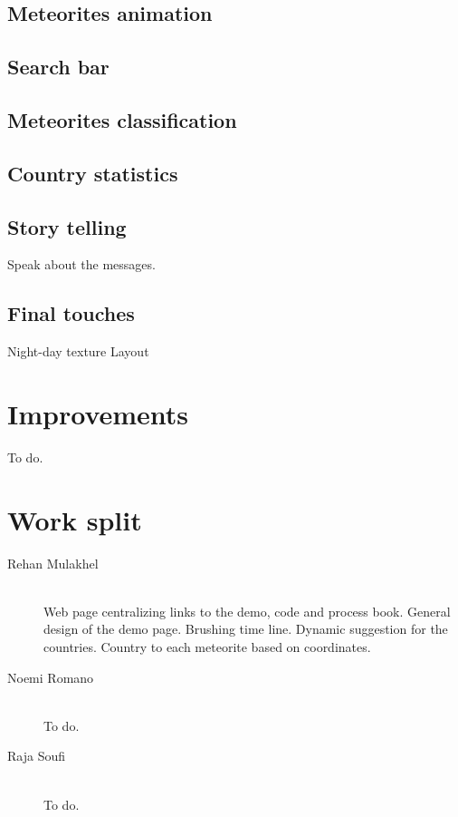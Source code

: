 \documentclass[10pt,conference,compsocconf]{IEEEtran}
\begin{document}
\subsection{Meteorites animation}







\subsection{Search bar}


\subsection{Meteorites classification}


\subsection{Country statistics}


\subsection{Story telling}
Speak about the messages. 

\subsection{Final touches}
Night-day texture
Layout






\section{Improvements}
\label{sec:improvements}

To do.

\section{Work split}
\label{sec:work_split}

\begin{description}
\item[Rehan Mulakhel] \ \\
  Web page centralizing links to the demo, code and process book. General design of the demo page. Brushing time line. Dynamic suggestion for the countries. Country to each meteorite based on coordinates. 
\item[Noemi Romano] \ \\
  To do.
\item[Raja Soufi] \ \\
  To do.
\end{description}






\end{document}
